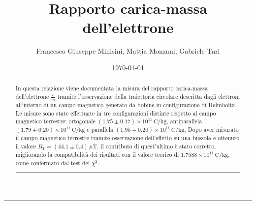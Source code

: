 \documentclass[a4paper,12pt]{article}
\title{Rapporto carica-massa dell'elettrone}
\author{Francesco Giuseppe Minisini, Mattia Monzani, Gabriele Turi}
\date{\today}
\begin{document}
\maketitle
\hrule
\vspace{9pt}
\begin{abstract}
    \noindent
    In questa relazione viene documentata la misura del rapporto carica-massa dell'elettrone \(\frac{e}{m}\) tramite l'osservazione della traiettoria circolare descritta dagli elettroni all'interno di un campo magnetico generato da bobine in configurazione di Helmholtz. Le misure sono state effettuate in tre configurazioni distinte rispetto al campo magnetico terrestre: ortogonale \((1.75 \pm 0.17) \times 10^{11} \, \text{C/kg}\), antiparallela \((1.79 \pm 0.20) \times 10^{11} \, \text{C/kg}\) e parallela \((1.95 \pm 0.20) \times 10^{11} \, \text{C/kg}\). Dopo aver misurato il campo magnetico terrestre tramite osservazione dell'effetto su una bussola e ottenuto il valore \(B_T = (44.1 \pm 0.4) \, \mu\text{T}\), il contributo di quest'ultimo è stato corretto, migliorando la compatibilità dei risultati con il valore teorico di \(1.7588 \times 10^{11} \, \text{C/kg}\), come confermato dal test del \(\chi^2\).
    
\vspace{20pt}
\hrule
\end{abstract}
\vspace{2 pt}
\end{document}
